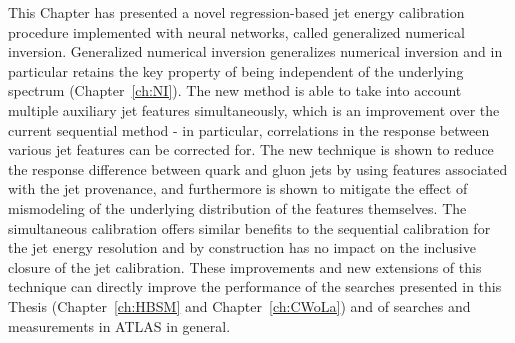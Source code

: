 
This Chapter has presented a novel regression-based jet energy calibration procedure implemented with neural networks, called generalized numerical inversion.
Generalized numerical inversion generalizes numerical inversion and in particular retains the key property of being independent of the underlying spectrum (Chapter~\ref{ch:NI}).
The new method is able to take into account multiple auxiliary jet features simultaneously, which is an improvement over the current sequential method - in particular, correlations in the response between various jet features can be corrected for.
The new technique is shown to reduce the response difference between quark and gluon jets by using features associated with the jet provenance, and furthermore is shown to mitigate the effect of mismodeling of the underlying distribution of the features themselves.
The simultaneous calibration offers similar benefits to the sequential calibration for the jet energy resolution and by construction has no impact on the inclusive closure of the jet calibration.
These improvements and new extensions of this technique can directly improve the performance of the searches presented in this Thesis (Chapter~\ref{ch:HBSM} and Chapter~\ref{ch:CWoLa}) and of searches and measurements in ATLAS in general.
